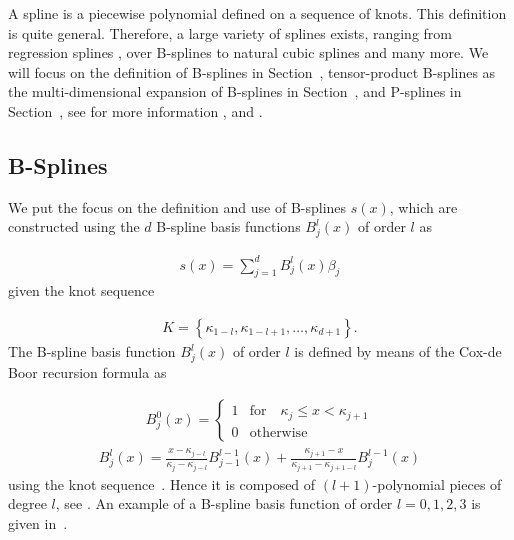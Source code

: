 A spline is a piecewise polynomial defined on a sequence of knots. This definition is quite general. Therefore, a large variety of splines exists, ranging from regression splines \cite{eubank1990regressionsplines}, over B-splines \cite{deBoor1978practicalGuideToSplines} to natural cubic splines and many more. We will focus on the definition of B-splines in Section~, tensor-product B-splines as the multi-dimensional expansion of B-splines in Section~, and P-splines in Section~, see for more information \cite{fahrmeir2007regression}, \cite{deBoor1978practicalGuideToSplines} and \cite{eilers1996flexible}.
\subsection{B-Splines} \label{subsec:b-splines}

We put the focus on the definition and use of B-splines $s(x)$, which are constructed using the $d$ B-spline basis functions $B_j^l(x)$ of order $l$ as

\begin{align}
	s(x) = \sum_{j=1}^d B_j^l(x) \beta_j 
\end{align}
%
given the knot sequence 

\begin{align} \label{eq:knot-sequence}
	K = \left\{\kappa_{1-l}, \kappa_{1-l+1}, \dots, \kappa_{d+1}\right\}.
\end{align}
%
The B-spline basis function $B_j^l(x)$ of order $l$ is defined by means of the Cox-de Boor recursion formula as

\begin{align} \label{eq:Bspline_recDef1}
	B_j^0(x) = \begin{cases} 1 & \text{for} \quad \kappa_j \le x < \kappa_{j+1} \\ 
					 		 0 & \text{otherwise} 
	\end{cases}
\end{align}
\begin{align} \label{eq:Bspline_recDef2}
	B_j^l(x) = \frac{x - \kappa_{j-l}}{\kappa_{j} - \kappa_{j-l}} B_{j-1}^{l-1}(x) + \frac{\kappa_{j+1} - x}{\kappa_{j+1} - \kappa_{j+1-l}} B_{j}^{l-1}(x)
\end{align}
%
using the knot sequence~. Hence it is composed of $(l+1)$-polynomial pieces of degree $l$, see \cite{fahrmeir2007regression}. An example of a B-spline basis function of order $l=0, 1, 2, 3$ is given in~. 


